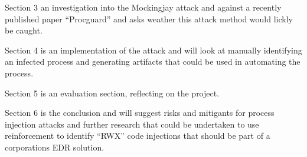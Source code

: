 Section 3 an investigation into the Mockingjay attack and against a recently published paper ``Procguard'' \autocite{Wang:2022} and asks weather this attack method would lickly be caught.


Section 4 is an implementation of the attack and will look at manually identifying an infected process and generating artifacts that could be used in automating the process.

Section 5 is an evaluation section, reflecting on the project.

Section 6 is the conclusion and will suggest risks and mitigants for process injection attacks and further research that could be undertaken to use reinforcement to identify ``RWX'' code injections that should be part of a corporations EDR solution.

